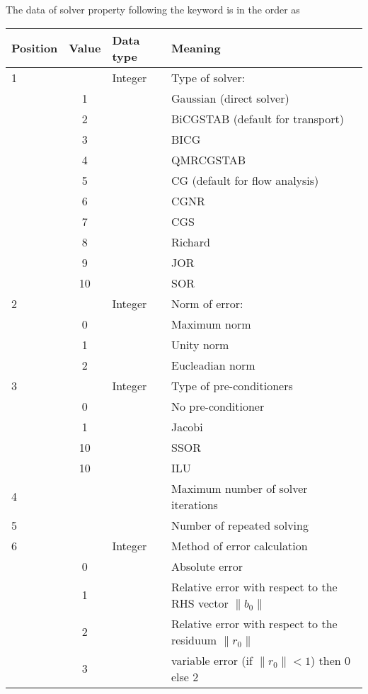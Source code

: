 The data of solver property following the keyword is in the order as

{\ttfamily
  \small
\begin{tabular}{|l|c|l|l|}
  \hline
  Position &Value & Data type & Meaning \\
  \hline
  \hline %

    1&   &Integer  &Type of solver:\\
    & 1 &         &Gaussian (direct solver)\\
    & 2 &         & BiCGSTAB (default for transport)\\
    & 3 &         & BICG                             \\
    & 4 &         & QMRCGSTAB \\
    & 5 &         & CG  (default for flow analysis)\\
    & 6 &         & CGNR  \\
    & 7 &         & CGS   \\
    & 8 &         & Richard \\
    & 9 &         & JOR    \\
    & 10 &         & SOR  \\
  \hline %
   2&   &Integer &Norm of error:\\
    & 0 &         &Maximum norm\\
    & 1 &         &Unity norm\\
    & 2 &         &Eucleadian norm  \\
  \hline %
   3&   &Integer &Type of pre-conditioners\\
    & 0 &      &No pre-conditioner   \\
    & 1 &      &Jacobi    \\
    & 10&      &SSOR    \\
    &10 &      & ILU    \\
  \hline %
   4&   &      &Maximum number of solver iterations\\
  \hline %
   5&   &      &Number of repeated solving\\
  \hline %
   6&   & Integer   &Method of error calculation\\
    &  0 &    &Absolute error\\
    &  1 &    &Relative error with respect to the RHS vector $\| b_0\|$\\
    &  2 &    &Relative error with respect to the residuum $\| r_0\|$\\
    &  3 &    &variable error (if $\| r_0\|<1$) then 0 else 2 \\

\end{tabular}}
